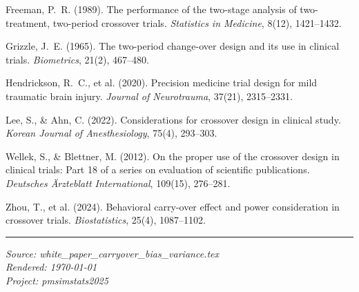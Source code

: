 \documentclass[11pt,a4paper]{article}
\begin{document}
\begin{description}[style=nextline,leftmargin=0pt,labelwidth=0pt]

\item Freeman, P.~R. (1989). The performance of the two-stage analysis of two-treatment,
two-period crossover trials. \textit{Statistics in Medicine}, 8(12), 1421--1432.

\item Grizzle, J.~E. (1965). The two-period change-over design and its use in clinical
trials. \textit{Biometrics}, 21(2), 467--480.

\item Hendrickson, R.~C., et al. (2020). Precision medicine trial design for mild
traumatic brain injury. \textit{Journal of Neurotrauma}, 37(21), 2315--2331.

\item Lee, S., \& Ahn, C. (2022). Considerations for crossover design in clinical study.
\textit{Korean Journal of Anesthesiology}, 75(4), 293--303.

\item Wellek, S., \& Blettner, M. (2012). On the proper use of the crossover design in
clinical trials: Part 18 of a series on evaluation of scientific publications.
\textit{Deutsches \"Arzteblatt International}, 109(15), 276--281.

\item Zhou, T., et al. (2024). Behavioral carry-over effect and power consideration in
crossover trials. \textit{Biostatistics}, 25(4), 1087--1102.

\end{description}

\vfill
\begin{center}
\rule{0.5\textwidth}{0.4pt}
\end{center}

\noindent\textit{Source: white\_paper\_carryover\_bias\_variance.tex}\\
\textit{Rendered: \today}\\
\textit{Project: pmsimstats2025}
\end{document}

